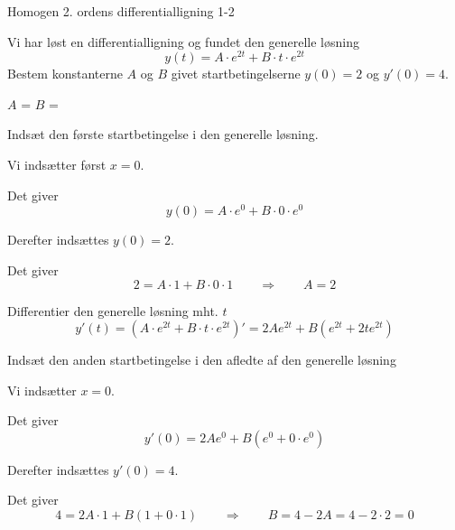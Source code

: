 \documentclass{article}
\begin{document}
\newpage

\begin{exercise}{Homogen 2. ordens differentialligning 1-2}
	
	Vi har løst en differentialligning og fundet den generelle løsning
	\[
	y(t) = A \cdot e^{2t} + B \cdot t \cdot e^{2t}
	\]
	Bestem konstanterne $A$ og $B$ givet startbetingelserne $y(0)=2$ og $y'(0)=4$.
	
	
	$A$ = 		
$B$ = 
	
	\hint
	
	Indsæt den første startbetingelse i den generelle løsning. 
	
	
	\hint
	
	Vi indsætter først $x=0$.
	
	\hint
	
	Det giver
	\[
	y(0)=  A \cdot e^{0} + B \cdot 0 \cdot e^{0}
	\]
	
	\hint
	
	Derefter indsættes $y(0)=2$.
	
	\hint 
	
	Det giver 
	\[
	2 = A \cdot 1 + B \cdot 0 \cdot 1 \qquad \Rightarrow \qquad A = 2
	\]
	
	\hint 
	
	Differentier den generelle løsning mht. $t$
	\[
	y'(t)= \left(A \cdot e^{2t} + B \cdot t \cdot e^{2t} \right)' = 2A e^{2t} + B \left( e^{2t} +2 t e^{2t} \right)
	\]
	
	\hint 
	
	Indsæt den anden startbetingelse i den afledte af den generelle løsning
	
	\hint
	
	Vi indsætter $x=0$.
	
	\hint 
	
	Det giver
	\[
	y'(0) = 2A e^{0} + B \left( e^{0} + 0 \cdot e^{0} \right)
	\]
	
	\hint 
	
	Derefter indsættes $y'(0)=4$.
	
	\hint
	
	Det giver
	\[
	4 = 2A \cdot 1 + B \left(1 + 0 \cdot 1 \right) \qquad \Rightarrow \qquad B = 4 - 2A = 4 - 2 \cdot 2 = 0
	\]
	
	
\end{exercise}

\newpage
\end{document}
